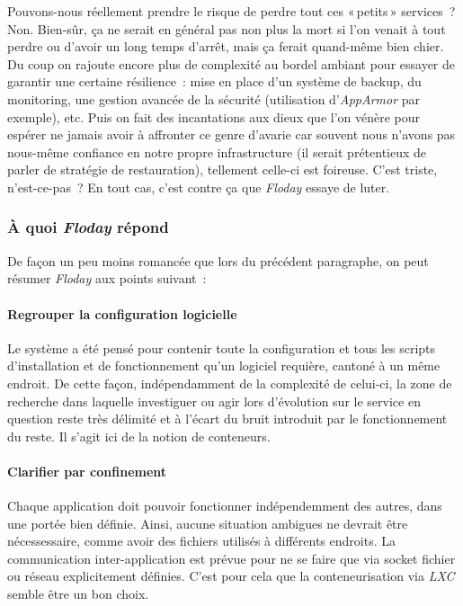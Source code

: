 Pouvons-nous réellement prendre le risque de perdre tout ces «\,petits\,» services~?
Non. Bien-sûr, ça ne serait en général pas non plus la mort si l'on venait à tout perdre ou d'avoir un long temps d'arrêt, mais ça ferait quand-même bien chier.
Du coup on rajoute encore plus de complexité au bordel ambiant pour essayer de garantir une certaine résilience~: mise en place d'un système de backup, du monitoring, une gestion avancée de la sécurité (utilisation d'\emph{AppArmor} par exemple), etc.
Puis on fait des incantations aux dieux que l'on vénère pour espérer ne jamais avoir à affronter ce genre d'avarie car souvent nous n'avons pas nous-même confiance en notre propre infrastructure (il serait prétentieux de parler de stratégie de restauration), tellement celle-ci est foireuse.
C'est triste, n'est-ce-pas~? En tout cas, c'est contre ça que \emph{Floday} essaye de luter.

\subsubsection{À quoi \emph{Floday} répond}
De façon un peu moins romancée que lors du précédent paragraphe, on peut résumer \emph{Floday} aux points suivant~:

\paragraph{Regrouper la configuration logicielle}
Le système a été pensé pour contenir toute la configuration et tous les scripts d'installation et de fonctionnement qu'un logiciel requière, cantoné à un même endroit.
De cette façon, indépendamment de la complexité de celui-ci, la zone de recherche dans laquelle investiguer ou agir lors d'évolution sur le service en question reste très délimité et à l'écart du bruit introduit par le fonctionnement du reste.
Il s'agit ici de la notion de \glspl{conteneur}.

\paragraph{Clarifier par confinement}
Chaque \gls{application} doit pouvoir fonctionner indépendemment des autres, dans une portée bien définie.
Ainsi, aucune situation ambigues ne devrait être nécessessaire, comme avoir des fichiers utilisés à différents endroits.
La communication inter-application est prévue pour ne se faire que via socket fichier ou réseau explicitement définies.
C'est pour cela que la conteneurisation via \emph{LXC} semble être un bon choix.


